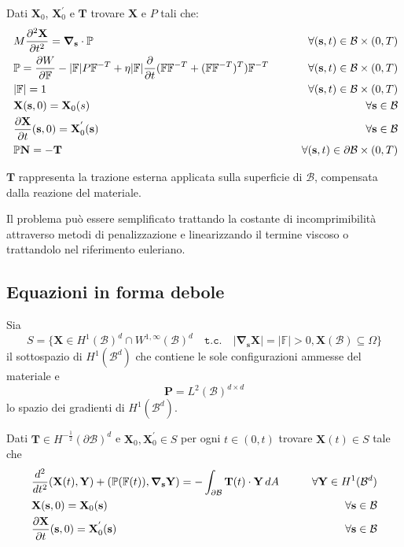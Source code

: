 Dati $\mathbf{X}_0$, $\mathbf{X}^{'}_0$ e $\mathbf{T}$ trovare $\mathbf{X}$ e $P$ tali che:
\begin{align*}
&M\frac{\partial^2\mathbf{X}}{\partial t^2} = \boldsymbol{\nabla}_\mathbf{s} \cdot \mathbb{P} &\qquad \forall(\mathbf{s},t)\in\mathcal{B}\times(0,T)\\
&\mathbb{P} = \frac{\partial W}{\partial\mathbb{F}} - \vert\mathbb{F}\vert P\mathbb{F}^{-T} + \eta\vert\mathbb{F}\vert \frac{\partial}{\partial t}(\mathbb{F}\mathbb{F}^{-T} + (\mathbb{F}\mathbb{F}^{-T})^T)\mathbb{F}^{-T}&\qquad \forall(\mathbf{s},t)\in\mathcal{B}\times(0,T)\\\
&\vert\mathbb{F}\vert =1&\qquad \forall(\mathbf{s},t)\in\mathcal{B}\times(0,T)\\\
&\mathbf{X}(\mathbf{s},0)=\mathbf{X}_0(s)&\qquad \forall\mathbf{s}\in\mathcal{B}\\\
&\frac{\partial \mathbf{X}}{\partial t}(\mathbf{s},0)=\mathbf{X}^{'}_0(\mathbf{s})&\qquad \forall\mathbf{s}\in\mathcal{B}\\
&\mathbb{P}\mathbf{N}=-\mathbf{T}&\qquad \forall(\mathbf{s},t)\in\partial\mathcal{B}\times(0,T)
\end{align*}

$\mathbf{T}$ rappresenta la trazione esterna applicata sulla superficie di $\mathcal{B}$, compensata dalla reazione del materiale.

Il problema può essere semplificato trattando la costante di incomprimibilità attraverso metodi di penalizzazione e linearizzando il termine viscoso o trattandolo nel riferimento euleriano.

\subsection{Equazioni in forma debole}

Sia
\begin{equation*}
S = \{ \mathbf{X} \in H^1(\mathcal{B})^d \cap W^{1,\infty}(\mathcal{B})^d \quad \texttt{t.c.} \quad \vert \boldsymbol {\nabla}_{\mathbf{s}}\mathbf{X}\vert = \vert \mathbb{F} \vert > 0, \mathbf{X}(\mathcal{B}) \subseteq \Omega \}
\end{equation*}
il sottospazio di $H^1(\mathcal{B}^d)$ che contiene le sole configurazioni ammesse del materiale e
\begin{equation*}
\mathbf{P} = L^2(\mathcal{B})^{d\times d}
\end{equation*}
lo spazio dei gradienti di $H^1(\mathcal{B}^d)$.

Dati $\mathbf{T} \in H^{-\frac{1}{2}}(\partial\mathcal{B})^d$ e $\mathbf{X}_0,\mathbf{X}^{'}_0 \in S$ per ogni $t \in (0,t)$ trovare $\mathbf{X}(t) \in S$ tale che 
\begin{align*}
&\frac{d^2}{dt^2}\ps{\mathbf{X}(t)}{\mathbf{Y}} + \ps{\mathbb{P}(\mathbb{F}(t))}{\Nabla_\mathbf{s} \mathbf{Y}} = -\int_{\partial\mathcal{B}}\mathbf{T}(t)\cdot\mathbf{Y}\,dA\qquad&\forall\mathbf{Y}\in H^1(\mathcal{B}^d)\\
&\mathbf{X}(\mathbf{s},0)=\mathbf{X}_0(\mathbf{s})\qquad&\forall\mathbf{s}\in\mathcal{B}\\
&\frac{\partial\mathbf{X}}{\partial t}(\mathbf{s},0)=\mathbf{X}^{'}_0(\mathbf{s})&\forall\mathbf{s}\in\mathcal{B}
\end{align*}

